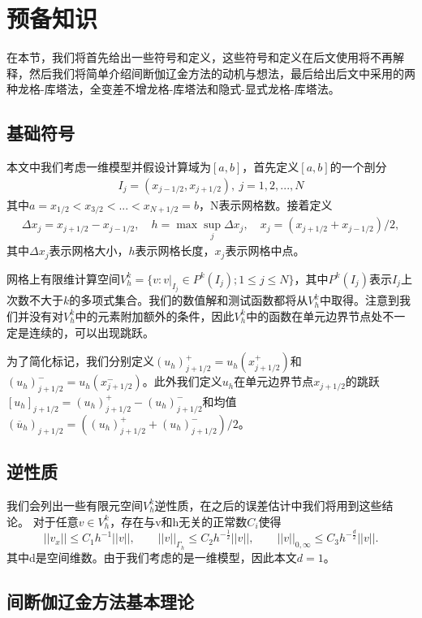 \cleardoublepage

\section{预备知识}
在本节，我们将首先给出一些符号和定义，这些符号和定义在后文使用将不再解释，然后我们将简单介绍间断伽辽金方法的动机与想法，最后给出后文中采用的两种龙格-库塔法，全变差不增龙格-库塔法和隐式-显式龙格-库塔法。
\subsection{基础符号}
本文中我们考虑一维模型并假设计算域为$[a,b]$，首先定义$[a,b]$的一个剖分
\begin{align*}
    I_{j} = (x_{j-1/2}, x_{j+1/2}), \ j = 1, 2, ..., N
\end{align*}
其中$a=x_{1/2} < x_{3/2}< ...< x_{N+1/2}=b$，N表示网格数。接着定义
\begin{align*}
    \Delta x_j = x_{j+1/2}-x_{j-1/2}, \quad h = \max{\sup_j{\Delta x_j}}, \quad x_j = (x_{j+1/2}+x_{j-1/2})/{2},
\end{align*}
其中$\Delta x_j$表示网格大小，$h$表示网格长度，$x_j$表示网格中点。

网格上有限维计算空间$V_h^k = \{v:v|_{I_j}\in P^k(I_j); 1\leq j\leq N\}$，其中$P^k(I_j)$表示$I_j$上次数不大于$k$的多项式集合。我们的数值解和测试函数都将从$V_h^k$中取得。注意到我们并没有对$V^k_h$中的元素附加额外的条件，因此$V_h^k$中的函数在单元边界节点处不一定是连续的，可以出现跳跃。

为了简化标记，我们分别定义$(u_h)^+_{j+1/2}=u_h(x^+_{j+1/2})$和$(u_h)^-_{j+1/2}=u_h(x^-_{j+1/2})$。此外我们定义$u_h$在单元边界节点$x_{j+1/2}$的跳跃$[u_h]_{j+1/2}=(u_h)^+_{j+1/2}-(u_h)^-_{j+1/2}$和均值$(\overline{u}_h)_{j+1/2}=((u_h)_{j+1/2}^++(u_h)_{j+1/2}^-)/2$。
\subsection{逆性质}
我们会列出一些有限元空间$V_h^k$逆性质\cite{ciarlet1978finite}，在之后的误差估计中我们将用到这些结论。
对于任意$v \in V_h^k$，存在与v和h无关的正常数$C_i$使得
\begin{equation}
    ||v_x|| \leq C_1 h^{-1} ||v||, \qquad
    ||v||_{\Gamma_h} \leq C_2 h^{-\frac{1}{2}}||v||, \qquad
    ||v||_{0,\infty} \leq C_3 h^{-\frac{d}{2}}||v||.
\end{equation}
其中d是空间维数。由于我们考虑的是一维模型，因此本文$d=1$。
\subsection{间断伽辽金方法基本理论}

